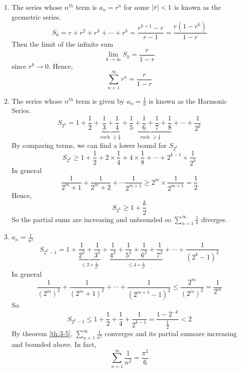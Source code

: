 \documentclass{article}
\begin{document}
\begin{eg}\leavevmode
    \begin{enumerate}[label=(\arabic*)]
        \item The series whose $n^{th}$ term is $a_n = r^n$ for some $\left\lvert r\right\rvert < 1$ is known as the geometric series.
        \[
            S_k = r + r^2 + r^3 + \cdots + r^k = \frac{r^{k+1} - r}{r - 1} = \frac{r(1 - r^k)}{1 - r}  
        \]
        Then the limit of the infinite sum
        \[
            \lim_{k \rightarrow \infty} S_k = \frac{r}{1 - r}  
        \]
        since $r^k \rightarrow 0$.
        Hence,
        \[
            \sum_{n=1}^{\infty} r^n = \frac{r}{1-r}  
        \]
        \item The series whose $n^{th}$ term is given by $a_n = \frac{1}{n}$ is known as the Harmonic Series.
        \[
            S_{2^k} = 1 + \frac{1}{2} + \underbrace{\frac{1}{3} + \frac{1}{4}}_{\text{each } \geq \frac{1}{4}} + \underbrace{\frac{1}{5} + \frac{1}{6} + \frac{1}{7} + \frac{1}{8}}_{\text{each } \geq \frac{1}{8}}  + \cdots + \frac{1}{2^k}
        \]
        By comparing terms, we can find a lower bound for $S_{2^k}$
        \[
            S_{2^k} \geq 1 + \frac{1}{2} + 2 \times \frac{1}{4} + 4 \times \frac{1}{8} + \cdots + 2^{k-1} \times \frac{1}{2^k}
        \]
        In general
        \[
            \frac{1}{2^m + 1} + \frac{1}{2^m + 2} + \cdots \frac{1}{2^{m+1}} \geq 2^m \times \frac{1}{2^{m+1}} = \frac{1}{2} 
        \]
        Hence,
        \[
            S_{2^k} \geq 1 + \frac{k}{2}  
        \]
        So the partial sums are increasing and unbounded so $\sum_{n=1}^{\infty} \frac{1}{n}$ diverges.

        \item $a_n = \frac{1}{n^2}$
        \[
            S_{2^k -1} = 1 + \underbrace{\frac{1}{2^2} + \frac{1}{3^2}}_{\leq 2 \times \frac{1}{2^2}} + \underbrace{\frac{1}{4^2} + \frac{1}{5^2} + \frac{1}{6^2} + \frac{1}{7^2}}_{\leq 4 \times \frac{1}{4^2}} + \cdots + \frac{1}{(2^k - 1)^2}   
        \]
        In general
        \[
            \frac{1}{(2^m)^2} + \frac{1}{(2^m + 1)^2} + \cdots + \frac{1}{(2^{m+1} -1)^2} \leq \frac{2^m}{(2^m)^2} = \frac{1}{2^m}  
        \]
        So
        \[
            S_{2^k -1} \leq 1 + \frac{1}{2} + \frac{1}{4} + \frac{1}{2^{k-1}} = \frac{1 - 2^{-k}}{\frac{1}{2}} < 2 
        \]
        By theorem \ref{th:3-5}, $\sum_{n=1}^{\infty} \frac{1}{n^2}$ converges and its partial sumsare increasing and bounded above.
        In fact,
        \[
            \sum_{n=1}^{\infty} \frac{1}{n^2} = \frac{\pi^2}{6}
        \]
    \end{enumerate}
\end{eg}
\end{document}
